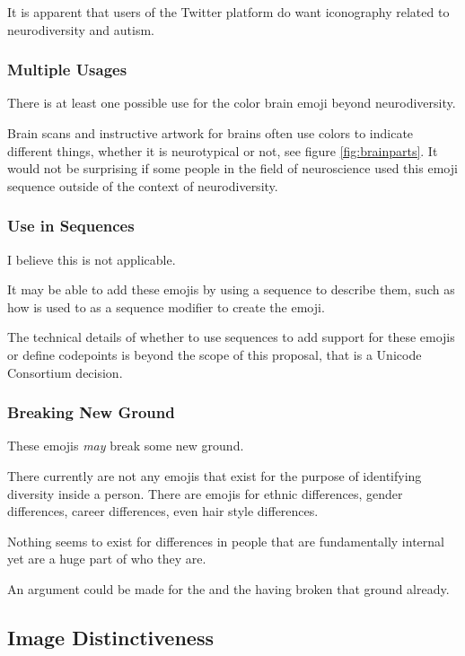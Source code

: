 It is apparent that users of the Twitter platform do want iconography related to neurodiversity
and autism.


\subsubsection{Multiple Usages}

There is at least one possible use for the color brain emoji beyond neurodiversity.

Brain scans and instructive artwork for brains often use colors to indicate different things,
whether it is neurotypical or not, see figure \ref{fig:brainparts}. It would not be surprising
if some people in the field of neuroscience used this emoji sequence outside of the context
of neurodiversity.


\subsubsection{Use in Sequences}

I believe this is not applicable.

It may be able to add these emojis by using a sequence to describe them, such as how
\rainbow{} is used to as a sequence modifier to create the
\prideflag{} emoji.

The technical details of whether to use sequences to add support for these emojis or define
codepoints is beyond the scope of this proposal, that is a Unicode Consortium decision.

\subsubsection{Breaking New Ground}

These emojis \emph{may} break some new ground.

There currently are not any emojis that exist for the purpose of identifying diversity inside
a person. There are emojis for ethnic differences, gender differences, career differences,
even hair style differences.

Nothing seems to exist for differences in people that are fundamentally internal yet are a
huge part of who they are.

An argument could be made for the \nerdface{} and the
\prideflag{} having broken that ground already.

\subsection{Image Distinctiveness}

